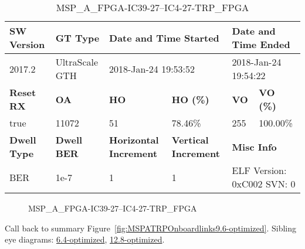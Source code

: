 \begin{table}[h]
\centering
\caption{MSP\_A\_FPGA-IC39-27--IC4-27-TRP\_FPGA}
\label{tab:MSPAFPGAIC3927IC427TRPFPGA9.6-optimized}
\begin{tabular}{@{}|l|l|l|l|l|l|@{}}
\toprule
\textbf{SW Version}                & \textbf{GT Type}   & \multicolumn{2}{l|}{\textbf{Date and Time Started}}            & \multicolumn{2}{l|}{\textbf{Date and Time Ended}}        \\ \midrule
2017.2                       & UltraScale GTH          & \multicolumn{2}{l|}{2018-Jan-24 19:53:52}                   & \multicolumn{2}{l|}{2018-Jan-24 19:54:22}               \\ \midrule
\textbf{Reset RX}                  & \textbf{OA} & \textbf{HO}   & \textbf{HO (\%)} & \textbf{VO} & \textbf{VO (\%)} \\ \midrule
true & 11072        & 51          & 78.46\%        & 255        & 100.00\%       \\ \midrule
\textbf{Dwell Type}                & \textbf{Dwell BER} & \textbf{Horizontal Increment} & \textbf{Vertical Increment}    & \multicolumn{2}{l|}{\textbf{Misc Info}}                  \\ \midrule
BER                            & 1e-7        & 1        & 1           & \multicolumn{2}{l|}{ELF Version: 0xC002 SVN: 0}                         \\ \bottomrule
\end{tabular}
\end{table}

\begin{figure}[h]
\caption{MSP\_A\_FPGA-IC39-27--IC4-27-TRP\_FPGA} \label{fig:MSPAFPGAIC3927IC427TRPFPGA9.6-optimized}
\end{figure}

Call back to summary Figure~\ref{fig:MSPATRPOnboardlinks9.6-optimized}.
Sibling eye diagrams: \hyperref[sec:MSPAFPGAIC3927IC427TRPFPGA6.4-optimized]{6.4-optimized}, \hyperref[sec:MSPAFPGAIC3927IC427TRPFPGA12.8-optimized]{12.8-optimized}.

\clearpage
\newpage

